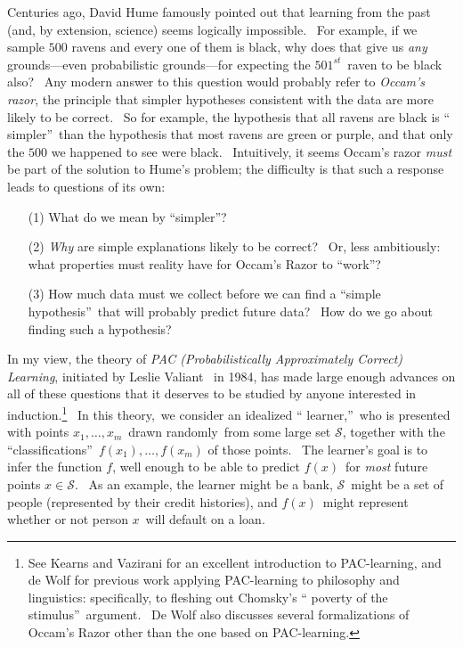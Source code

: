 \documentclass[12pt,onecolumn]{article}%
\begin{document}
Centuries ago, David Hume \cite{hume} famously pointed out that learning from
the past (and, by extension, science) seems logically impossible. \ For
example, if we sample $500$ ravens and every one of them is black, why does
that give us \textit{any} grounds---even probabilistic grounds---for expecting
the $501^{st}$\ raven to be black also? \ Any modern answer to this question
would probably refer to \textit{Occam's razor}, the principle that simpler
hypotheses consistent with the data are more likely to be correct. \ So for
example, the hypothesis that all ravens are black is \textquotedblleft
simpler\textquotedblright\ than the hypothesis that most ravens are green or
purple, and that only the $500$ we happened to see were black. \ Intuitively,
it seems Occam's razor \textit{must} be part of the solution to Hume's
problem; the difficulty is that such a response leads to questions of its own:

\begin{enumerate}
\item[(1)] What do we mean by \textquotedblleft simpler\textquotedblright?

\item[(2)] \textit{Why} are simple explanations likely to be correct? \ Or,
less ambitiously: what properties must reality have for Occam's Razor to
\textquotedblleft work\textquotedblright?

\item[(3)] How much data must we collect before we can find a
\textquotedblleft simple hypothesis\textquotedblright\ that will probably
predict future data? \ How do we go about finding such a hypothesis?
\end{enumerate}

In my view, the theory of \textit{PAC (Probabilistically Approximately
Correct) Learning}, initiated by Leslie Valiant \cite{valiant:pac}\ in 1984,
has made large enough advances on all of these questions that it deserves to
be studied by anyone interested in induction.\footnote{See Kearns and Vazirani
\cite{kvaz} for an excellent introduction to PAC-learning, and de Wolf
\cite{dewolf:masters} for previous work applying PAC-learning to philosophy
and linguistics: specifically, to fleshing out Chomsky's \textquotedblleft
poverty of the stimulus\textquotedblright\ argument. \ De Wolf also discusses
several formalizations of Occam's Razor other than the one based on
PAC-learning.} \ In this theory,\ we consider an idealized \textquotedblleft
learner,\textquotedblright\ who is presented with points $x_{1},\ldots,x_{m}%
$\ drawn randomly\ from some large set $\mathcal{S}$, together with the
\textquotedblleft classifications\textquotedblright\ $f\left(  x_{1}\right)
,\ldots,f\left(  x_{m}\right)  $ of those points. \ The learner's goal is to
infer the function $f$, well enough to be able to predict $f\left(  x\right)
$\ for \textit{most} future points $x\in\mathcal{S}$. \ As an example, the
learner might be a bank, $\mathcal{S}$\ might be a set of people (represented
by their credit histories), and $f\left(  x\right)  $\ might represent whether
or not person $x$\ will default on a loan.
\end{document}
